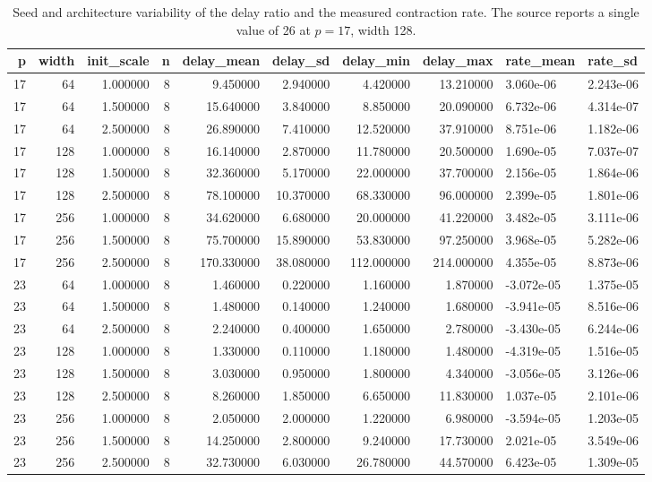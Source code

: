 \begin{table}
\caption{Seed and architecture variability of the delay ratio and the measured contraction rate. The source reports a single value of 26 at $p=17$, width 128.}
\label{tab:variability}
\begin{tabular}{rrrrrrrrll}
\toprule
p & width & init_scale & n & delay_mean & delay_sd & delay_min & delay_max & rate_mean & rate_sd \\
\midrule
17 & 64 & 1.000000 & 8 & 9.450000 & 2.940000 & 4.420000 & 13.210000 & 3.060e-06 & 2.243e-06 \\
17 & 64 & 1.500000 & 8 & 15.640000 & 3.840000 & 8.850000 & 20.090000 & 6.732e-06 & 4.314e-07 \\
17 & 64 & 2.500000 & 8 & 26.890000 & 7.410000 & 12.520000 & 37.910000 & 8.751e-06 & 1.182e-06 \\
17 & 128 & 1.000000 & 8 & 16.140000 & 2.870000 & 11.780000 & 20.500000 & 1.690e-05 & 7.037e-07 \\
17 & 128 & 1.500000 & 8 & 32.360000 & 5.170000 & 22.000000 & 37.700000 & 2.156e-05 & 1.864e-06 \\
17 & 128 & 2.500000 & 8 & 78.100000 & 10.370000 & 68.330000 & 96.000000 & 2.399e-05 & 1.801e-06 \\
17 & 256 & 1.000000 & 8 & 34.620000 & 6.680000 & 20.000000 & 41.220000 & 3.482e-05 & 3.111e-06 \\
17 & 256 & 1.500000 & 8 & 75.700000 & 15.890000 & 53.830000 & 97.250000 & 3.968e-05 & 5.282e-06 \\
17 & 256 & 2.500000 & 8 & 170.330000 & 38.080000 & 112.000000 & 214.000000 & 4.355e-05 & 8.873e-06 \\
23 & 64 & 1.000000 & 8 & 1.460000 & 0.220000 & 1.160000 & 1.870000 & -3.072e-05 & 1.375e-05 \\
23 & 64 & 1.500000 & 8 & 1.480000 & 0.140000 & 1.240000 & 1.680000 & -3.941e-05 & 8.516e-06 \\
23 & 64 & 2.500000 & 8 & 2.240000 & 0.400000 & 1.650000 & 2.780000 & -3.430e-05 & 6.244e-06 \\
23 & 128 & 1.000000 & 8 & 1.330000 & 0.110000 & 1.180000 & 1.480000 & -4.319e-05 & 1.516e-05 \\
23 & 128 & 1.500000 & 8 & 3.030000 & 0.950000 & 1.800000 & 4.340000 & -3.056e-05 & 3.126e-06 \\
23 & 128 & 2.500000 & 8 & 8.260000 & 1.850000 & 6.650000 & 11.830000 & 1.037e-05 & 2.101e-06 \\
23 & 256 & 1.000000 & 8 & 2.050000 & 2.000000 & 1.220000 & 6.980000 & -3.594e-05 & 1.203e-05 \\
23 & 256 & 1.500000 & 8 & 14.250000 & 2.800000 & 9.240000 & 17.730000 & 2.021e-05 & 3.549e-06 \\
23 & 256 & 2.500000 & 8 & 32.730000 & 6.030000 & 26.780000 & 44.570000 & 6.423e-05 & 1.309e-05 \\
\bottomrule
\end{tabular}
\end{table}
